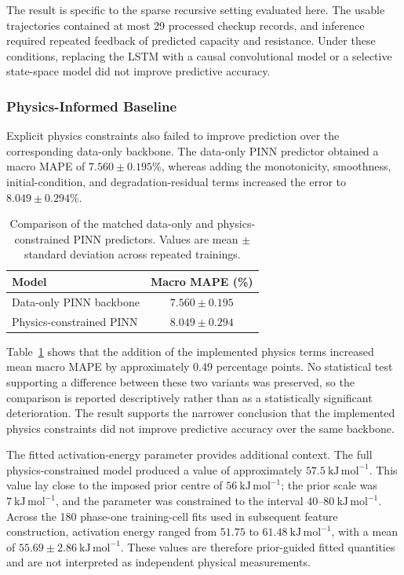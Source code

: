 \documentclass[a4paper,fleqn]{cas-sc}
\begin{document}
The result is specific to the sparse recursive setting evaluated here. The usable trajectories contained at most 29 processed checkup records, and inference required repeated feedback of predicted capacity and resistance. Under these conditions, replacing the LSTM with a causal convolutional model or a selective state-space model did not improve predictive accuracy.




\subsubsection{Physics-Informed Baseline}
\label{sec:pinn_results}

Explicit physics constraints also failed to improve prediction over the corresponding data-only backbone. The data-only PINN predictor obtained a macro MAPE of $7.560\pm0.195$\%, whereas adding the monotonicity, smoothness, initial-condition, and degradation-residual terms increased the error to $8.049\pm0.294$\%.

\begin{table}[htbp]
\centering
\caption{Comparison of the matched data-only and physics-constrained PINN predictors. Values are mean $\pm$ standard deviation across repeated trainings.}
\label{tab:pinn_results}
\begin{tabular}{lc}
\toprule
\textbf{Model} &
\textbf{Macro MAPE (\%)} \\
\midrule
Data-only PINN backbone &
$7.560 \pm 0.195$ \\

Physics-constrained PINN &
$8.049 \pm 0.294$ \\
\bottomrule
\end{tabular}
\end{table}

Table~\ref{tab:pinn_results} shows that the addition of the implemented physics terms increased mean macro MAPE by approximately 0.49 percentage points. No statistical test supporting a difference between these two variants was preserved, so the comparison is reported descriptively rather than as a statistically significant deterioration. The result supports the narrower conclusion that the implemented physics constraints did not improve predictive accuracy over the same backbone.

The fitted activation-energy parameter provides additional context. The full
physics-constrained model produced a value of approximately
\(57.5~\mathrm{kJ\,mol^{-1}}\). This value lay close to the imposed prior
centre of \(56~\mathrm{kJ\,mol^{-1}}\); the prior scale was
\(7~\mathrm{kJ\,mol^{-1}}\), and the parameter was constrained to the interval
\(40\text{--}80~\mathrm{kJ\,mol^{-1}}\). Across the 180 phase-one training-cell fits used in subsequent feature
construction, activation energy ranged from
\(51.75\) to \(61.48~\mathrm{kJ\,mol^{-1}}\), with a mean of
\(55.69 \pm 2.86~\mathrm{kJ\,mol^{-1}}\). These values are therefore
prior-guided fitted quantities and are not interpreted as independent
physical measurements.
\end{document}
